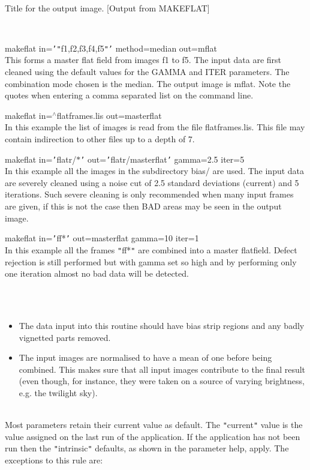 \documentclass[twoside,11pt]{article}
\renewcommand{\_}{\texttt{\symbol{95}}}
\newcommand{\qt}[1]{{\tt "}#1{\tt "}}
\newcommand{\qs}[1]{{\tt '}#1{\tt '}}
\newcommand{\sstexamples}[1]{
   \item[Examples:] \mbox{} \\
   \vspace{-3.5ex}
   \begin{description}
      #1
   \end{description}
}
\newcommand{\sstsubsection}[1]{ \item[{#1}] \mbox{} \\}
\newcommand{\sstexamplesubsection}[2]{\sloppy \item{\ssttt #1} \mbox{} \\ #2 }
\newcommand{\sstnotes}[1]{\item[Notes:] \mbox{} \\[1.3ex] #1}
\newcommand{\sstdiytopic}[2]{\item[#1:] \mbox{} \\[1.3ex] #2}
\newcommand{\sstitemlist}[1]{
  \mbox{} \\
  \vspace{-3.5ex}
  \begin{itemize}
     #1
  \end{itemize}
}
\newcommand{\sstitem}{\item}
\newcommand{\sstexamples}[1]{
      \item[Examples:] \\
      \begin{description}
         #1
      \end{description}
      \\
   }
\newcommand{\sstsubsection}[1]{\item[{#1}]}
\newcommand{\sstexamplesubsection}[2]{\item[{\ssttt #1}] #2}
\newcommand{\sstnotes}[1]{\item[Notes:] #1 }
\newcommand{\sstdiytopic}[2]{\item[{#1}] #2 }
\newcommand{\sstitemlist}[1]{
      \begin{itemize}
         #1
      \end{itemize}
      \\
   }
\newcommand{\sstitem}{\item}
\begin{document}
{{{      }
      \sstsubsection{
         TITLE = LITERAL (Read)
      } {
         Title for the output image.
         [Output from MAKEFLAT]
      }
   }
   \sstexamples{
      \sstexamplesubsection{
         makeflat in=\qs{\qt{f1,f2,f3,f4,f5}} method=median out=mflat
      } {
         This forms a master flat field from images f1 to f5. The input
         data are first cleaned using the default values for the GAMMA
         and ITER parameters. The combination mode chosen is the
         median.  The output image is mflat. Note the quotes when
         entering a comma separated list on the command line.
      }
      \sstexamplesubsection{
         makeflat in=$^\wedge$flat\_frames.lis out=master\_flat
      } {
         In this example the list of images is read from the file
         flat\_frames.lis. This file may contain indirection to other files
         up to a depth of 7.
      }
      \sstexamplesubsection{
         makeflat in=\qs{flatr/$*$} out=\qs{flatr/master\_flat}
         gamma=2.5 iter=5
      } {
         In this example all the images in the subdirectory bias/ are
         used. The input data are severely cleaned using a noise cut
         of 2.5 standard deviations (current) and 5 iterations. Such
         severe cleaning is only recommended when many input frames
         are given, if this is not the case then BAD areas may be seen
         in the output image.
      }
      \sstexamplesubsection{
        makeflat in=\qs{ff*} out=master\_flat gamma=10 iter=1
      } {
        In this example all the frames \qt{ff*} are combined into a master
        flatfield. Defect rejection is still performed but with
        gamma set so high and by performing only one iteration
        almost no bad data will be detected.
      }



   }
   \sstnotes{
      \sstitemlist{

         \sstitem
         The data input into this routine should have bias strip
         regions and any badly vignetted parts removed.

         \sstitem 
         The input images are normalised to have a mean of one
         before being combined. This makes sure that all input images
         contribute to the final result (even though, for instance,
         they were taken on a source of varying brightness, e.g. the 
         twilight sky).
      }
   }
   \sstdiytopic{
      Behaviour of parameters
   } {
      Most parameters retain their current value as default. The
      \qt{current} value is the value assigned on the last run of the
      application. If the application has not been run then the
      \qt{intrinsic} defaults, as shown in the parameter help, apply.
      The exceptions to this rule are:
      \sstitemlist{

}}}
\end{document}
